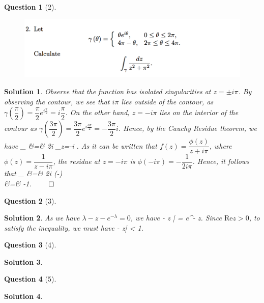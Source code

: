 \documentclass{article} %
\def\eQb#1\eQe{\begin{eqnarray*}#1\end{eqnarray*}}
\theoremstyle{quest}
\newtheorem*{question}{Question}
\newtheorem*{solution}{Solution}
\begin{document}
\bigskip
\begin{question}[2]
\hfill
\begin{figure}[h!]
\centering
\includegraphics[width=1\textwidth]{cv-9-2}
\end{figure}
\end{question}
\begin{solution}
Observe that the function has isolated singularities at $z = \pm i \pi$. 
By observing the contour, we see that $i \pi$ lies outside of the contour,
as $\gamma(\dfrac{\pi}{2}) = \dfrac{\pi}{2}e^{i\frac{\pi}{2}} = 
i\dfrac{\pi}{2}$. On the other hand, $z = -i\pi$ lies on the interior of the
contour 
as $\gamma(\dfrac{3\pi}{2}) = \dfrac{3\pi}{2}e^{i\frac{3\pi}{2}} =
-\dfrac{3\pi}{2}i$. Hence, by the Cauchy Residue theorem, we have
\eQb
\int_{\gamma}  &=& 2\pi i _{z=-i\pi} 
.
\eQe  
As it can be written that $f(z) = \dfrac{\phi(z)}{z+i\pi}$, where
$\phi(z) = \dfrac{1}{z - i\pi}$, the residue at $z=-i\pi$ is 
$\phi(-i\pi) = -\dfrac{1}{2i\pi}$. Hence, it follows that
\eQb
\int_{\gamma}  &=& 2\pi i (-) \\
&=& -1. 
\eQe
\hfill $\qed$
\end{solution}

\begin{question}[3]
\end{question}
\begin{solution}
As we have $\lambda - z -e^{-\lambda} = 0$, we have 
\eQb
| \lambda - z | = e^{- z}. 
\eQe
Since $\text{Re} z > 0$, to satisfy the inequality, we must have
\eQb
| \lambda - z| < 1.
\eQe

\end{solution}

\bigskip

\begin{question}[4]
\end{question}
\begin{solution}

\end{solution}

\bigskip

\begin{question}[5]
\end{question}
\begin{solution}
\end{solution}
\end{document}
